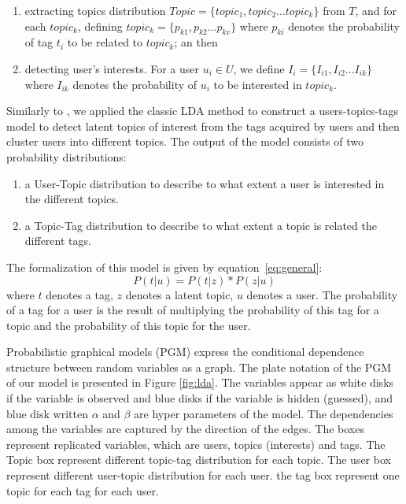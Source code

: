 \begin{enumerate}
 \item extracting topics distribution $Topic=\{topic_1,topic_2...topic_k\}$ from $T$, and for each $topic_k$, defining $topic_k=\{p_{k1},p_{k2}...p_{kv}\}$ where $p_{ki}$ denotes the probability of tag $t_i$ to be related to $topic_k$; an then
  \item detecting user's interests. For a user $u_i \in U$, we define $I_i=\{I_{i1},I_{i2}...I_{ik}\}$ where $I_{ik}$ denotes the probability of $u_i$ to be interested in $topic_k$.
\end{enumerate}

Similarly to \cite{Li:2010:CTM:1871437.1871673}, we applied the classic LDA method to construct a users-topics-tags model to detect latent topics of interest from the tags acquired by users and then cluster users into different topics. The output of the model consists of two probability distributions:
\begin{enumerate}
 \item a User-Topic distribution to describe to what extent a user is interested in the different topics.
 \item a Topic-Tag distribution to describe to what extent a topic is related the different tags.
\end{enumerate}



The formalization of this model is given by equation~\ref{eq:general}: 
\begin{equation}
P(t|u)=P(t|z)*P(z|u)
\label{eq:general}
\end{equation}
where $t$ denotes a tag, $z$ denotes a latent topic, $u$ denotes a user. The probability of a tag for a user is the result of multiplying the probability of this tag for a topic and the probability of this topic for the user.

Probabilistic graphical models (PGM) express the conditional dependence structure between random variables as a graph. 
The plate notation of the PGM of our model is presented in Figure \ref{fig:lda}. 
The variables appear as white disks if the variable is observed and blue disks if the variable is hidden (guessed), and blue disk written $\alpha$ and $\beta$ are hyper parameters of the model.
The dependencies among the variables are captured by the direction of the edges. 
The boxes represent replicated variables, which are users, topics (interests) and tags. 
The Topic box represent different topic-tag distribution for each topic.
The user box represent different user-topic distribution for each user.
the tag box represent one topic for each tag for each user.

